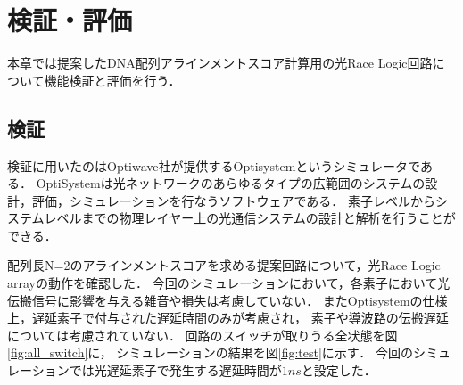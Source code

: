 \chapter{検証・評価}
本章では提案したDNA配列アラインメントスコア計算用の光Race Logic回路について機能検証と評価を行う．
\section{検証}
検証に用いたのはOptiwave社が提供するOptisystemというシミュレータである．
OptiSystemは光ネットワークのあらゆるタイプの広範囲のシステムの設計，評価，シミュレーションを行なうソフトウェアである．
素子レベルからシステムレベルまでの物理レイヤー上の光通信システムの設計と解析を行うことができる．

配列長N=2のアラインメントスコアを求める提案回路について，光Race Logic arrayの動作を確認した．
今回のシミュレーションにおいて，各素子において光伝搬信号に影響を与える雑音や損失は考慮していない．
またOptisystemの仕様上，遅延素子で付与された遅延時間のみが考慮され，
素子や導波路の伝搬遅延については考慮されていない．
回路のスイッチが取りうる全状態を図\ref{fig:all_switch}に，
シミュレーションの結果を図\ref{fig:test}に示す．
今回のシミュレーションでは光遅延素子で発生する遅延時間が$1ns$と設定した．
